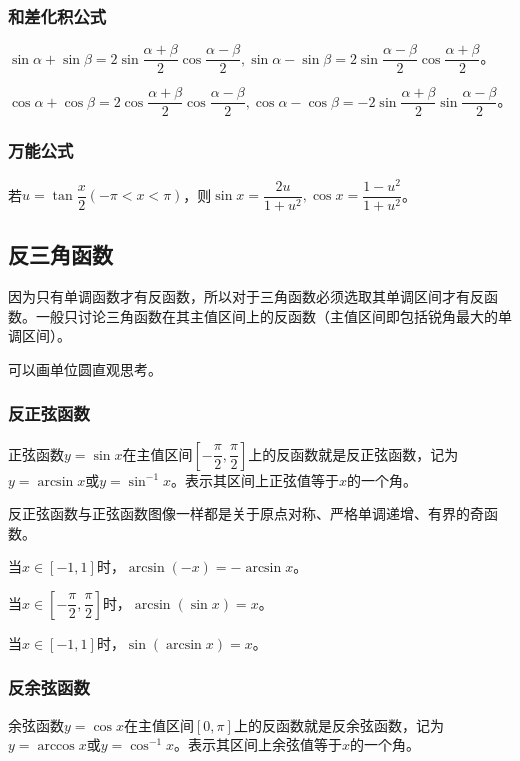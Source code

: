 \documentclass[UTF8, 12pt]{ctexart}
\begin{document}
\subsubsection{和差化积公式}

$\sin\alpha+\sin\beta=2\sin\dfrac{\alpha+\beta}{2}\cos\dfrac{\alpha-\beta}{2},\sin\alpha-\sin\beta=2\sin\dfrac{\alpha-\beta}{2}\cos\dfrac{\alpha+\beta}{2}$。

$\cos\alpha+\cos\beta=2\cos\dfrac{\alpha+\beta}{2}\cos\dfrac{\alpha-\beta}{2},\cos\alpha-\cos\beta=-2\sin\dfrac{\alpha+\beta}{2}\sin\dfrac{\alpha-\beta}{2}$。

\subsubsection{万能公式}

若$u=\tan\dfrac{x}{2}(-\pi<x<\pi)$，则$\sin x=\dfrac{2u}{1+u^2},\cos x=\dfrac{1-u^2}{1+u^2}$。

\subsection{反三角函数}

因为只有单调函数才有反函数，所以对于三角函数必须选取其单调区间才有反函数。一般只讨论三角函数在其主值区间上的反函数（主值区间即包括锐角最大的单调区间）。

可以画单位圆直观思考。

\subsubsection{反正弦函数}

正弦函数$y=\sin x$在主值区间$\left[-\dfrac{\pi}{2},\dfrac{\pi}{2}\right]$上的反函数就是反正弦函数，记为$y=\arcsin x$或$y=\sin^{-1}x$。表示其区间上正弦值等于$x$的一个角。

反正弦函数与正弦函数图像一样都是关于原点对称、严格单调递增、有界的奇函数。

当$x\in[-1,1]$时，$\arcsin(-x)=-\arcsin x$。

当$x\in\left[-\dfrac{\pi}{2},\dfrac{\pi}{2}\right]$时，$\arcsin(\sin x)=x$。

当$x\in[-1,1]$时，$\sin(\arcsin x)=x$。

\subsubsection{反余弦函数}

余弦函数$y=\cos x$在主值区间$[0,\pi]$上的反函数就是反余弦函数，记为$y=\arccos x$或$y=\cos^{-1}x$。表示其区间上余弦值等于$x$的一个角。
\end{document}
